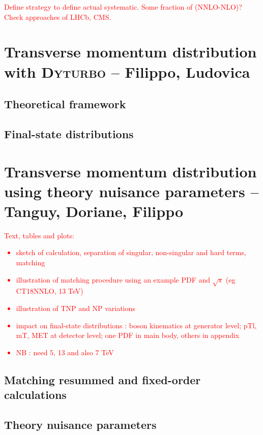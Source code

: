 \textcolor{red}{Define strategy to define actual systematic. Some fraction of (NNLO-NLO)? Check approaches of LHCb, CMS.}


\section{Transverse momentum distribution with \textsc{Dyturbo} -- Filippo, Ludovica}

\subsection{Theoretical framework}

\subsection{Final-state distributions}


\section{Transverse momentum distribution using theory nuisance parameters -- Tanguy, Doriane, Filippo}

\textcolor{red}{Text, tables and plots:
\begin{itemize}
\item sketch of calculation, separation of singular, non-singular and hard terms, matching
\item illustration of matching procedure using an example PDF and $\sqrt{s}$ (eg CT18NNLO, 13 TeV)
\item illustration of TNP and NP variations
\item impact on final-state distributions : boson kinematics at generator level; pTl, mT, MET at detector level; one PDF in main body, others in appendix
\item NB : need 5, 13 and also 7 TeV
\end{itemize}}

\subsection{Matching resummed and fixed-order calculations}

\subsection{Theory nuisance parameters}

